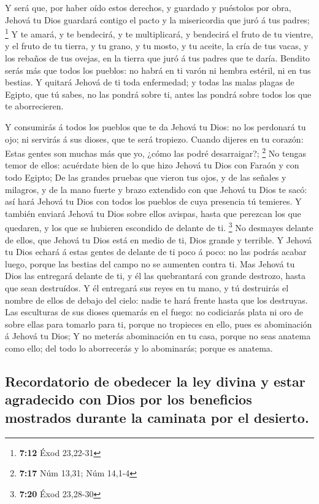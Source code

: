 Y será que, por haber oído estos derechos, y guardado y
puéstolos por obra, Jehová tu Dios guardará contigo el pacto y la
misericordia que juró á tus padres; \footnote{\textbf{7:12} Éxod
  23,22-31}  Y te amará, y te bendecirá, y te multiplicará,
y bendecirá el fruto de tu vientre, y el fruto de tu tierra, y tu grano,
y tu mosto, y tu aceite, la cría de tus vacas, y los rebaños de tus
ovejas, en la tierra que juró á tus padres que te daría. 
Bendito serás más que todos los pueblos: no habrá en ti varón ni hembra
estéril, ni en tus bestias.  Y quitará Jehová de ti toda
enfermedad; y todas las malas plagas de Egipto, que tú sabes, no las
pondrá sobre ti, antes las pondrá sobre todos los que te aborrecieren.

 Y consumirás á todos los pueblos que te da Jehová tu Dios:
no los perdonará tu ojo; ni servirás á sus dioses, que te será tropiezo.
 Cuando dijeres en tu corazón: Estas gentes son muchas más
que yo, ¿cómo las podré desarraigar?; \footnote{\textbf{7:17} Núm 13,31;
  Núm 14,1-4}  No tengas temor de ellos: acuérdate bien de
lo que hizo Jehová tu Dios con Faraón y con todo Egipto; 
De las grandes pruebas que vieron tus ojos, y de las señales y milagros,
y de la mano fuerte y brazo extendido con que Jehová tu Dios te sacó:
así hará Jehová tu Dios con todos los pueblos de cuya presencia tú
temieres.  Y también enviará Jehová tu Dios sobre ellos
avispas, hasta que perezcan los que quedaren, y los que se hubieren
escondido de delante de ti. \footnote{\textbf{7:20} Éxod 23,28-30}
 No desmayes delante de ellos, que Jehová tu Dios está en
medio de ti, Dios grande y terrible.  Y Jehová tu Dios
echará á estas gentes de delante de ti poco á poco: no las podrás acabar
luego, porque las bestias del campo no se aumenten contra ti.
 Mas Jehová tu Dios las entregará delante de ti, y él las
quebrantará con grande destrozo, hasta que sean destruídos.
 Y él entregará sus reyes en tu mano, y tú destruirás el
nombre de ellos de debajo del cielo: nadie te hará frente hasta que los
destruyas.  Las esculturas de sus dioses quemarás en el
fuego: no codiciarás plata ni oro de sobre ellas para tomarlo para ti,
porque no tropieces en ello, pues es abominación á Jehová tu Dios;
 Y no meterás abominación en tu casa, porque no seas
anatema como ello; del todo lo aborrecerás y lo abominarás; porque es
anatema.

\hypertarget{recordatorio-de-obedecer-la-ley-divina-y-estar-agradecido-con-dios-por-los-beneficios-mostrados-durante-la-caminata-por-el-desierto.}{%
\subsection{Recordatorio de obedecer la ley divina y estar agradecido
con Dios por los beneficios mostrados durante la caminata por el
desierto.}\label{recordatorio-de-obedecer-la-ley-divina-y-estar-agradecido-con-dios-por-los-beneficios-mostrados-durante-la-caminata-por-el-desierto.}}

